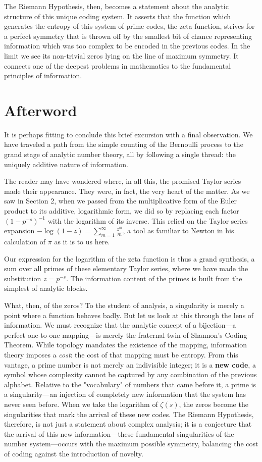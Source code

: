 \documentclass[12pt]{article}
\begin{document}
The Riemann Hypothesis, then, becomes a statement about the analytic structure of this unique coding system. It asserts that the function which generates the entropy of this system of prime codes, the zeta function, strives for a perfect symmetry that is thrown off by the smallest bit of chance representing information which was too complex to be encoded in the previous codes. In the limit we see its non-trivial zeros lying on the line of maximum symmetry. It connects one of the deepest problems in mathematics to the fundamental principles of information.

\section*{Afterword}

It is perhaps fitting to conclude this brief excursion with a final observation. We have traveled a path from the simple counting of the Bernoulli process to the grand stage of analytic number theory, all by following a single thread: the uniquely additive nature of information.

The reader may have wondered where, in all this, the promised Taylor series made their appearance. They were, in fact, the very heart of the matter. As we saw in Section 2, when we passed from the multiplicative form of the Euler product to its additive, logarithmic form, we did so by replacing each factor $(1-p^{-s})^{-1}$ with the logarithm of its inverse. This relied on the Taylor series expansion $-\log(1-z) = \sum_{m=1}^{\infty} \frac{z^m}{m}$, a tool as familiar to Newton in his calculation of $\pi$ as it is to us here.

Our expression for the logarithm of the zeta function is thus a grand synthesis, a sum over all primes of these elementary Taylor series, where we have made the substitution $z = p^{-s}$. The information content of the primes is built from the simplest of analytic blocks.

What, then, of the zeros? To the student of analysis, a singularity is merely a point where a function behaves badly. But let us look at this through the lens of information. We must recognize that the analytic concept of a bijection—a perfect one-to-one mapping—is merely the fraternal twin of Shannon's Coding Theorem. While topology mandates the existence of the mapping, information theory imposes a \textit{cost}: the cost of that mapping must be entropy. From this vantage, a prime number is not merely an indivisible integer; it is a \textbf{new code}, a symbol whose complexity cannot be captured by any combination of the previous alphabet. Relative to the "vocabulary" of numbers that came before it, a prime is a singularity—an injection of completely new information that the system has never seen before. When we take the logarithm of $\zeta(s)$, the zeros become the singularities that mark the arrival of these new codes. The Riemann Hypothesis, therefore, is not just a statement about complex analysis; it is a conjecture that the arrival of this new information—these fundamental singularities of the number system—occurs with the maximum possible symmetry, balancing the cost of coding against the introduction of novelty.
\end{document}
